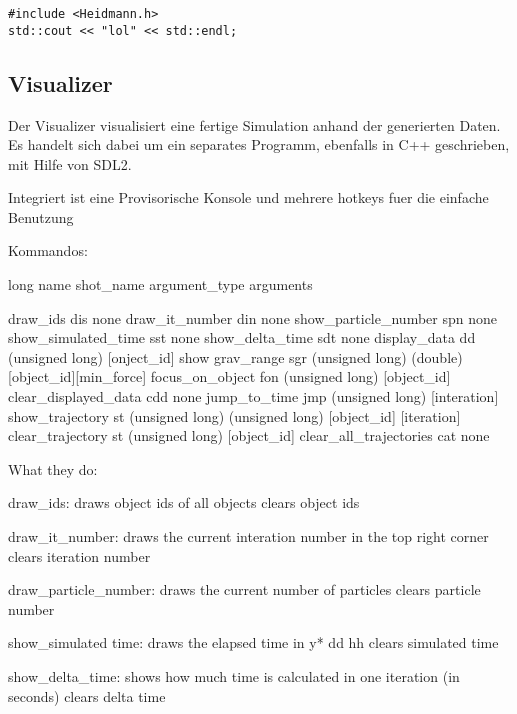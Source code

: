 \begin{verbatim}
#include <Heidmann.h>
std::cout << "lol" << std::endl;
\end{verbatim}


\subsection{Visualizer}
Der Visualizer visualisiert eine fertige Simulation anhand der generierten Daten.
Es handelt sich dabei um ein separates Programm, ebenfalls in C++ geschrieben,
mit Hilfe von SDL2.

Integriert ist eine Provisorische Konsole und mehrere hotkeys fuer die einfache Benutzung


Kommandos:

long name           shot\_name           argument\_type                   arguments

draw\_ids                dis             none
draw\_it\_number          din             none
show\_particle\_number    spn             none
show\_simulated\_time     sst             none    
show\_delta\_time         sdt             none    
display\_data            dd              (unsigned long)                 [onject\_id]
show grav\_range         sgr             (unsigned long) (double)        [object\_id][min\_force]
focus\_on\_object         fon             (unsigned long)                 [object\_id]
clear\_displayed\_data    cdd             none 
jump\_to\_time            jmp             (unsigned long)                 [interation]
show\_trajectory         st              (unsigned long) (unsigned long) [object\_id] [iteration]
clear\_trajectory        st              (unsigned long)                 [object\_id]
clear\_all\_trajectories cat             none

What they do:

draw\_ids:
    draws object ids of all objects
    clears object ids

draw\_it\_number:
    draws the current interation number in the top right corner
    clears iteration number

draw\_particle\_number:
    draws the current number of particles
    clears particle number

show\_simulated time:
    draws the elapsed time in y* dd hh
    clears simulated time

show\_delta\_time:
    shows how much time is calculated in one iteration (in seconds)
    clears delta time

